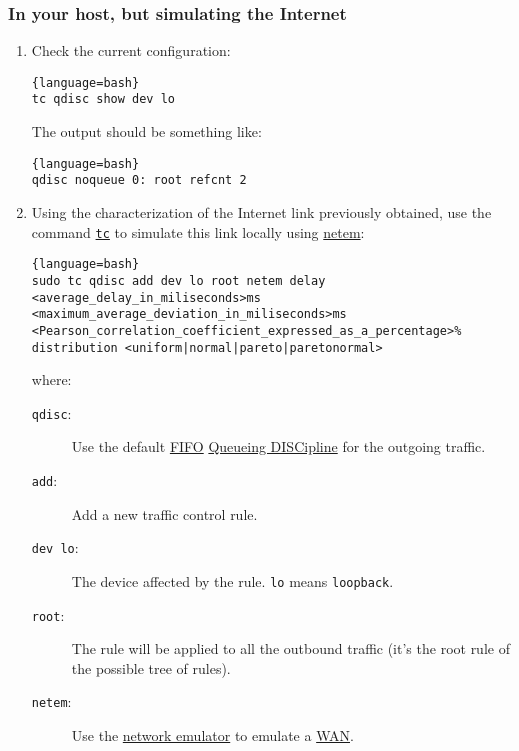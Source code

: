 \subsubsection{In your host, but simulating the Internet}

\begin{enumerate}

\item Check the current configuration:
  
  \begin{lstlisting}{language=bash}
tc qdisc show dev lo
  \end{lstlisting}
  
  The output should be something like:
  
  \begin{lstlisting}{language=bash}
qdisc noqueue 0: root refcnt 2
  \end{lstlisting}
  
\item Using the characterization of the Internet link previously
  obtained, use the command
  \href{https://man7.org/linux/man-pages/man8/tc.8.html}{\texttt{tc}}
  to simulate this link locally using
  \href{https://man7.org/linux/man-pages/man8/tc-netem.8.html}{netem}:

  \begin{lstlisting}{language=bash}
sudo tc qdisc add dev lo root netem delay <average_delay_in_miliseconds>ms <maximum_average_deviation_in_miliseconds>ms <Pearson_correlation_coefficient_expressed_as_a_percentage>% distribution <uniform|normal|pareto|paretonormal>
  \end{lstlisting}
  where:
  \begin{description}
  \item [\texttt{qdisc}:] Use the default
    \href{https://en.wikipedia.org/wiki/FIFO_(computing_and_electronics)}{FIFO}
    \href{https://wiki.debian.org/TrafficControl}{Queueing DISCipline}
    for the outgoing traffic.
  \item [\texttt{add}:] Add a new traffic control rule.
  \item [\texttt{dev lo}:] The device affected by the
    rule. \verb|lo| means \verb|loopback|.
  \item [\texttt{root}:] The rule will be applied to all the outbound
    traffic (it's the root rule of the possible tree of rules).
  \item [\texttt{netem}:] Use the
    \href{https://wiki.linuxfoundation.org/networking/netem}{network
      emulator} to emulate a
    \href{https://en.wikipedia.org/wiki/Wide_area_network}{WAN}.
  \end{description}


\end{enumerate}

